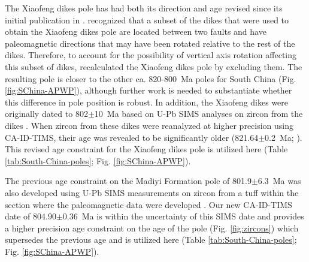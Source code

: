 The Xiaofeng dikes pole has had both its direction and age revised since its initial publication in \citet{Li2004a}. \citet{Jing2019a} recognized that a subset of the dikes that were used to obtain the Xiaofeng dikes pole are located between two faults and have paleomagnetic directions that may have been rotated relative to the rest of the dikes. Therefore, to account for the possibility of vertical axis rotation affecting this subset of dikes, \citet{Jing2019a} recalculated the Xiaofeng dikes pole by excluding them. The resulting pole is closer to the other ca. 820-800~Ma poles for South China (Fig. \ref{fig:SChina-APWP}), although further work is needed to substantiate whether this difference in pole position is robust. In addition, the Xiaofeng dikes were originally dated to 802$\pm$10~Ma based on U-Pb SIMS analyses on zircon from the dikes \citep{Li2004a}. When zircon from these dikes were reanalyzed at higher precision using CA-ID-TIMS, their age was revealed to be significantly older (821.64$\pm$0.2~Ma; \citealp{Wang2016b}). This revised age constraint for the Xiaofeng dikes pole is utilized here (Table \ref{tab:South-China-poles}; Fig. \ref{fig:SChina-APWP}).

The previous age constraint on the Madiyi Formation pole of 801.9$\pm$6.3~Ma was also developed using U-Pb SIMS measurements on zircon from a tuff within the section where the paleomagnetic data were developed \citep{Xian2020a}. Our new CA-ID-TIMS date of 804.90$\pm$0.36~Ma is within the uncertainty of this SIMS date and provides a higher precision age constraint on the age of the pole (Fig. \ref{fig:zircons}) which supersedes the previous age and is utilized here (Table \ref{tab:South-China-poles}; Fig. \ref{fig:SChina-APWP}).

